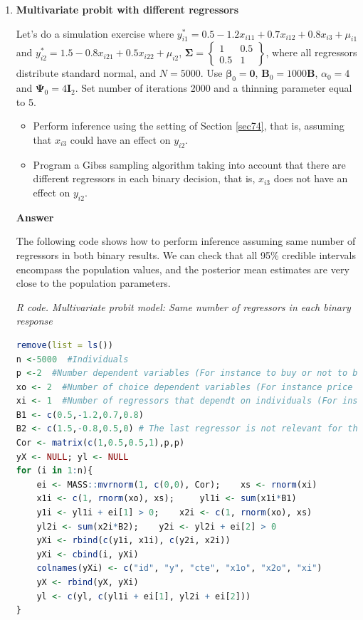 \begin{enumerate}[leftmargin=*]
\item \textbf{Multivariate probit with different regressors}

Let's do a simulation exercise where $y_{i1}^*=0.5-1.2x_{i11}+0.7x_{i12}+0.8x_{i3}+\mu_{i1}$ and $y_{i2}^*=1.5-0.8x_{i21}+0.5x_{i22}+\mu_{i2}$, $\bm{\Sigma}=\begin{Bmatrix}
	1 & 0.5\\
	0.5 & 1
\end{Bmatrix}$, where all regressors distribute standard normal, and $N=5000$. Use $\bm{\beta}_0=\bm{0}$, $\bm{B}_0=1000\bm{B}$, $\alpha_0=4$ and $\bm{\Psi}_0=4\bm{I}_2$. Set number of iterations 2000 and a thinning parameter equal to 5.  

\begin{itemize}
	\item Perform inference using the setting of Section \ref{sec74}, that is, assuming that $x_{i3}$ could have an effect on $y_{i2}$.
	\item Program a Gibss sampling algorithm taking into account that there are different regressors in each binary decision, that is, $x_{i3}$ does not have an effect on $y_{i2}$. 
\end{itemize}  

\textbf{Answer}

The following code shows how to perform inference assuming same number of regressors in both binary results. We can check that all 95\% credible intervals encompass the population values, and the posterior mean estimates are very close to the population parameters. 

\begin{tcolorbox}[enhanced,width=4.67in,center upper,
	fontupper=\large\bfseries,drop shadow southwest,sharp corners]
	\textit{R code. Multivariate probit model: Same number of regressors in each binary response}
	\begin{VF}
		\begin{lstlisting}[language=R]
remove(list = ls())
n <-5000  #Individuals
p <-2  #Number dependent variables (For instance to buy or not to buy different products)
xo <- 2  #Number of choice dependent variables (For instance price of products)
xi <- 1  #Number of regressors that dependt on individuals (For instance income)
B1 <- c(0.5,-1.2,0.7,0.8)
B2 <- c(1.5,-0.8,0.5,0) # The last regressor is not relevant for the second product
Cor <- matrix(c(1,0.5,0.5,1),p,p)
yX <- NULL; yl <- NULL
for (i in 1:n){
	ei <- MASS::mvrnorm(1, c(0,0), Cor); 	xs <- rnorm(xi)
	x1i <- c(1, rnorm(xo), xs); 	yl1i <- sum(x1i*B1)
	y1i <- yl1i + ei[1] > 0; 	x2i <- c(1, rnorm(xo), xs)
	yl2i <- sum(x2i*B2); 	y2i <- yl2i + ei[2] > 0
	yXi <- rbind(c(y1i, x1i), c(y2i, x2i))
	yXi <- cbind(i, yXi)
	colnames(yXi) <- c("id", "y", "cte", "x1o", "x2o", "xi")
	yX <- rbind(yX, yXi)
	yl <- c(yl, c(yl1i + ei[1], yl2i + ei[2])) 
}


\end{lstlisting}
\end{VF}
\end{tcolorbox}
\end{enumerate}
